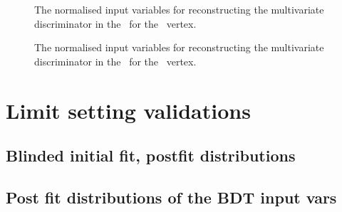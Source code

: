 \begin{figure}[htbp]
	\centering
	\caption{The normalised input variables for reconstructing the multivariate discriminator in the \TTSR\ for the \Zct\ vertex.}
	\label{fig:toppairZctprefitstack}
\end{figure}

\begin{figure}[htbp]
	\centering
	\caption{The normalised input variables for reconstructing the multivariate discriminator in the \STSR\ for the \Zct\ vertex.}
	\label{fig:singletopZctprefitstack}
\end{figure}


\chapter{Limit setting validations}
\section{Blinded initial fit, postfit distributions}
\label{app:IniFitDis}

\clearpage
\section{Post fit distributions of the BDT input vars}
\label{app:PostFit}
